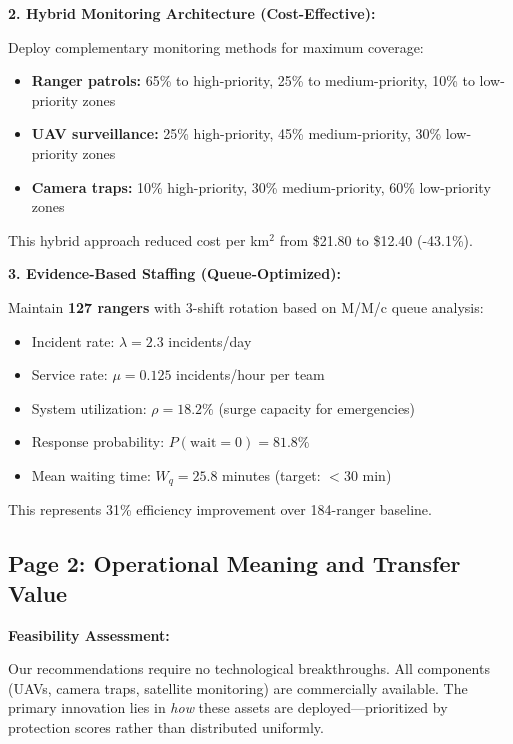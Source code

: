 \noindent \textbf{2. Hybrid Monitoring Architecture (Cost-Effective):}

Deploy complementary monitoring methods for maximum coverage:
\begin{itemize}
\item \textbf{Ranger patrols:} 65\% to high-priority, 25\% to medium-priority, 10\% to low-priority zones
\item \textbf{UAV surveillance:} 25\% high-priority, 45\% medium-priority, 30\% low-priority zones
\item \textbf{Camera traps:} 10\% high-priority, 30\% medium-priority, 60\% low-priority zones
\end{itemize}

\noindent This hybrid approach reduced cost per km$^2$ from \$21.80 to \$12.40 (-43.1\%).

\noindent \textbf{3. Evidence-Based Staffing (Queue-Optimized):}

Maintain \textbf{127 rangers} with 3-shift rotation based on M/M/c queue analysis:
\begin{itemize}
\item Incident rate: $\lambda = 2.3$ incidents/day
\item Service rate: $\mu = 0.125$ incidents/hour per team
\item System utilization: $\rho = 18.2\%$ (surge capacity for emergencies)
\item Response probability: $P(\text{wait}=0) = 81.8\%$
\item Mean waiting time: $W_q = 25.8$ minutes (target: $<30$ min)
\end{itemize}

\noindent This represents 31\% efficiency improvement over 184-ranger baseline.

\vspace{0.5cm}

\newpage

\subsection*{Page 2: Operational Meaning and Transfer Value}

\noindent \textbf{Feasibility Assessment:}

Our recommendations require no technological breakthroughs. All components (UAVs, camera traps, satellite monitoring) are commercially available. The primary innovation lies in \textit{how} these assets are deployed—prioritized by protection scores rather than distributed uniformly.

